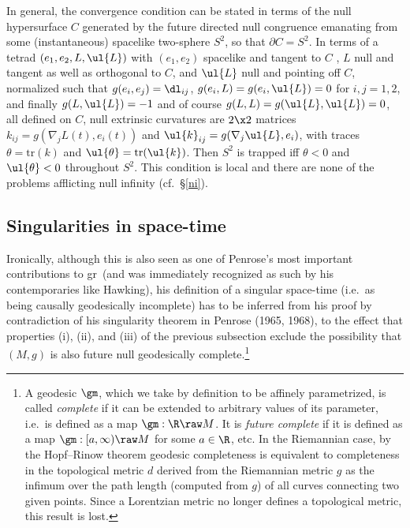 \documentclass[11pt,a4paper]{article}
\newcommand{\n}{\nabla}
\newcommand{\p}{\partial}
\newcommand{\GR}{{\sc gr}}
\begin{document}
In general, the convergence condition can be stated  in terms of the null hypersurface $C$ generated by the future directed null congruence emanating from some (instantaneous) spacelike two-sphere $S^2$, so that $\p C=S^2$. In terms of a tetrad $(e_1,e_2, L, \ul{L})$
with  $(e_1,e_2)$ spacelike and tangent to $C$ , $L$ null and tangent as well as orthogonal to $C$, and $\ul{L}$ null and pointing off $C$, normalized such that $g(e_i,e_j)= \dl_{ij}$, $g(e_i,L)=g(e_i,\ul{L})=0$ for $i,j=1,2$, and finally
$g(L,\ul{L})=-1$ and of course $g(L,L)=g(\ul{L},\ul{L})=0$, 
 all defined on $C$,  null extrinsic curvatures are $2\x 2$ matrices  $k_{ij}=g(\n_jL(t),e_i(t))$ and  $\ul{k}_{ij}=g(\n_j\ul{L},e_i)$, with traces $\theta=\mathrm{tr}(k)$ and  $\ul{\theta}=\mathrm{tr}(\ul{k})$. 
 Then $S^2$ is trapped iff $\theta<0$ and $\ul{\theta}<0$ throughout $S^2$. 
  This condition is local and there are none of the problems afflicting null infinity (cf.\ \S\ref{ni}). 
\subsection{Singularities in space-time}\label{sst}
Ironically, although this is also seen as one of Penrose's most important contributions to \GR\ (and was immediately recognized as such by his contemporaries like Hawking), his definition of a singular space-time (i.e.\ as being causally geodesically incomplete) has to be inferred from his proof by contradiction of his singularity theorem in Penrose (1965, 1968), to the effect that properties (i), (ii), and (iii) of the previous subsection exclude the possibility that $(M,g)$ is also future null geodesically complete.\footnote{\label{gdf} A geodesic $\gm$, which we take by definition to be affinely parametrized,  is called \emph{complete} if it can be extended to  arbitrary values of its parameter, i.e.\ is defined as a map $\gm:\R\raw M$. It is  \emph{future complete} if it is defined as a map $\gm:[a,\infty)\raw M$ for some $a\in\R$, etc. In the Riemannian case, by the Hopf--Rinow theorem geodesic completeness is equivalent to completeness in the topological metric $d$ derived from the Riemannian metric $g$  as the infimum over the path length (computed from $g$) of all curves connecting two given points. Since a Lorentzian metric no longer defines a topological metric, this result is lost. } 
\end{document}
